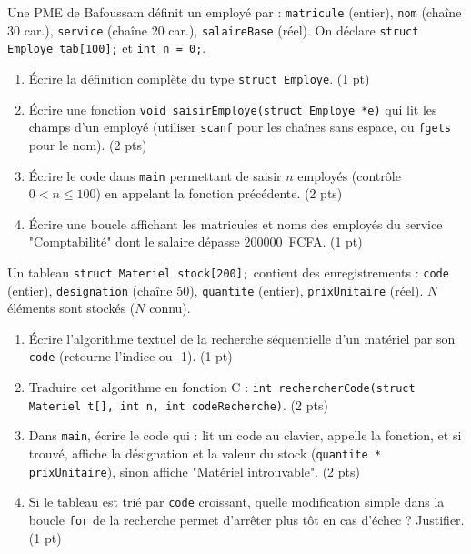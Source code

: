 \documentclass[11pt]{article}
\begin{document}
\begin{exercice}
Une PME de Bafoussam définit un employé par : \texttt{matricule} (entier), \texttt{nom} (chaîne 30 car.), \texttt{service} (chaîne 20 car.), \texttt{salaireBase} (réel). On déclare \texttt{struct Employe tab[100];} et \texttt{int n = 0;}.
\begin{enumerate}
    \item Écrire la définition complète du type \texttt{struct Employe}. (1 pt)
    \item Écrire une fonction \texttt{void saisirEmploye(struct Employe *e)} qui lit les champs d'un employé (utiliser \texttt{scanf} pour les chaînes sans espace, ou \texttt{fgets} pour le nom). (2 pts)
    \item Écrire le code dans \texttt{main} permettant de saisir $n$ employés (contrôle $0 < n \le 100$) en appelant la fonction précédente. (2 pts)
    \item Écrire une boucle affichant les matricules et noms des employés du service "Comptabilité" dont le salaire dépasse \SI{200000}{FCFA}. (1 pt)
\end{enumerate}
\end{exercice}

\begin{exercice}
Un tableau \texttt{struct Materiel stock[200];} contient des enregistrements : \texttt{code} (entier), \texttt{designation} (chaîne 50), \texttt{quantite} (entier), \texttt{prixUnitaire} (réel). $N$ éléments sont stockés ($N$ connu).
\begin{enumerate}
    \item Écrire l'algorithme textuel de la recherche séquentielle d'un matériel par son \texttt{code} (retourne l'indice ou -1). (1 pt)
    \item Traduire cet algorithme en fonction C : \texttt{int rechercherCode(struct Materiel t[], int n, int codeRecherche)}. (2 pts)
    \item Dans \texttt{main}, écrire le code qui : lit un code au clavier, appelle la fonction, et si trouvé, affiche la désignation et la valeur du stock (\texttt{quantite * prixUnitaire}), sinon affiche "Matériel introuvable". (2 pts)
    \item Si le tableau est trié par \texttt{code} croissant, quelle modification simple dans la boucle \texttt{for} de la recherche permet d'arrêter plus tôt en cas d'échec ? Justifier. (1 pt)
\end{enumerate}
\end{exercice}
\end{document}
